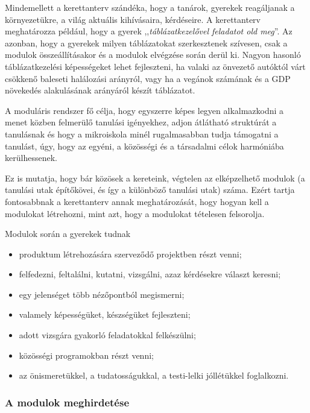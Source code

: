 Mindemellett a kerettanterv szándéka, hogy a tanárok, gyerekek
reagáljanak a környezetükre, a világ aktuális kihívásaira, kérdéseire. A
kerettanterv meghatározza például, hogy a gyerek ,,\emph{táblázatkezelővel
      feladatot old meg}''. Az azonban, hogy a gyerekek milyen táblázatokat
szerkesztenek szívesen, csak a
modulok összeállításakor és a modulok elvégzése során derül ki.
Nagyon hasonló táblázatkezelési képességeket lehet
fejleszteni, ha valaki az önvezető autóktól várt csökkenő baleseti halálozási
arányról, vagy ha a vegánok számának és a GDP növekedés alakulásának
arányáról készít táblázatot.

A moduláris rendszer fő célja,
hogy egyszerre képes legyen alkalmazkodni a menet közben felmerülő
tanulási igényekhez,
adjon átlátható struktúrát a tanulásnak
és hogy a mikroiskola minél rugalmasabban tudja támogatni a tanulást,
úgy, hogy az egyéni, a közösségi és a társadalmi célok harmóniába
kerülhessenek.

Ez is mutatja, hogy bár közösek a kereteink, végtelen az elképzelhető
modulok (a tanulási utak építőkövei, és így a különböző tanulási utak)
száma. Ezért tartja fontosabbnak a kerettanterv annak meghatározását,
hogy
hogyan kell a modulokat létrehozni, mint azt, hogy a modulokat tételesen
felsorolja.

Modulok során a gyerekek tudnak

\begin{itemize}
      \item produktum létrehozására szerveződő projektben részt venni;

      \item felfedezni, feltalálni, kutatni, vizsgálni, azaz kérdésekre választ
            keresni;

      \item egy jelenséget több nézőpontból megismerni;

      \item valamely képességüket, készségüket fejleszteni;

      \item adott vizsgára gyakorló feladatokkal felkészülni;

      \item közösségi programokban részt venni;

      \item az önismeretükkel, a tudatosságukkal, a testi-lelki jóllétükkel
            foglalkozni.
\end{itemize}

\subsubsection{A modulok meghirdetése}

